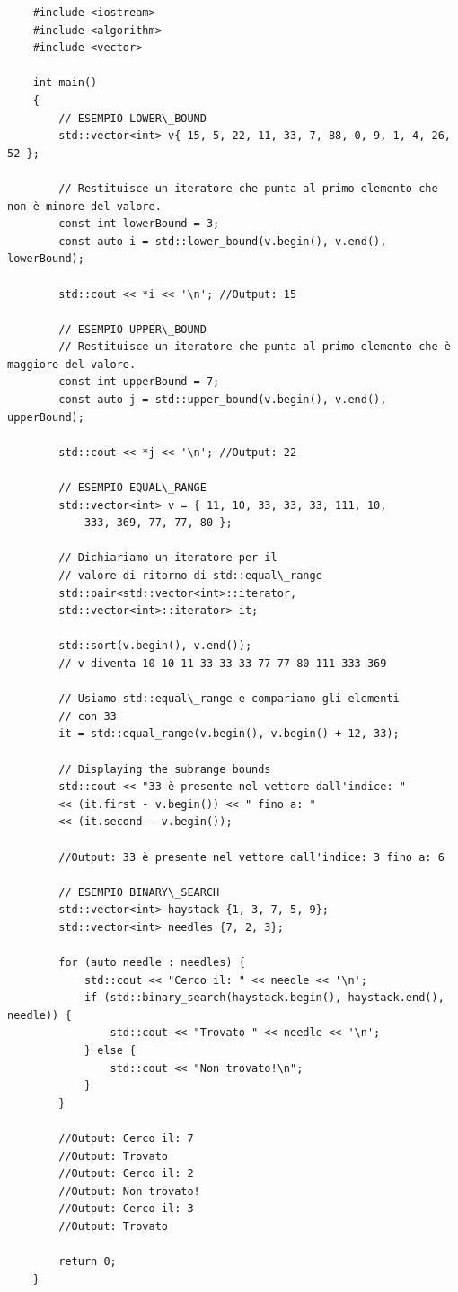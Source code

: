 \begin{lstlisting}
	#include <iostream>
	#include <algorithm>
	#include <vector>
	
	int main()
	{
		// ESEMPIO LOWER\_BOUND
		std::vector<int> v{ 15, 5, 22, 11, 33, 7, 88, 0, 9, 1, 4, 26, 52 };
		
		// Restituisce un iteratore che punta al primo elemento che non è minore del valore.
		const int lowerBound = 3;
		const auto i = std::lower_bound(v.begin(), v.end(), lowerBound);
		
		std::cout << *i << '\n'; //Output: 15
		
		// ESEMPIO UPPER\_BOUND
		// Restituisce un iteratore che punta al primo elemento che è maggiore del valore.
		const int upperBound = 7;
		const auto j = std::upper_bound(v.begin(), v.end(), upperBound);
		
		std::cout << *j << '\n'; //Output: 22
		
		// ESEMPIO EQUAL\_RANGE
		std::vector<int> v = { 11, 10, 33, 33, 33, 111, 10,
			333, 369, 77, 77, 80 };
		
		// Dichiariamo un iteratore per il
		// valore di ritorno di std::equal\_range
		std::pair<std::vector<int>::iterator,
		std::vector<int>::iterator> it;
		
		std::sort(v.begin(), v.end());
		// v diventa 10 10 11 33 33 33 77 77 80 111 333 369
		
		// Usiamo std::equal\_range e compariamo gli elementi
		// con 33
		it = std::equal_range(v.begin(), v.begin() + 12, 33);
		
		// Displaying the subrange bounds
		std::cout << "33 è presente nel vettore dall'indice: "
		<< (it.first - v.begin()) << " fino a: "
		<< (it.second - v.begin());
		
		//Output: 33 è presente nel vettore dall'indice: 3 fino a: 6
		
		// ESEMPIO BINARY\_SEARCH
		std::vector<int> haystack {1, 3, 7, 5, 9};
		std::vector<int> needles {7, 2, 3};
		
		for (auto needle : needles) {
			std::cout << "Cerco il: " << needle << '\n';
			if (std::binary_search(haystack.begin(), haystack.end(), needle)) {
				std::cout << "Trovato " << needle << '\n';
			} else {
				std::cout << "Non trovato!\n";
			}
		}
	
		//Output: Cerco il: 7
		//Output: Trovato
		//Output: Cerco il: 2
		//Output: Non trovato!
		//Output: Cerco il: 3
		//Output: Trovato
		
		return 0;
	}
\end{lstlisting}

